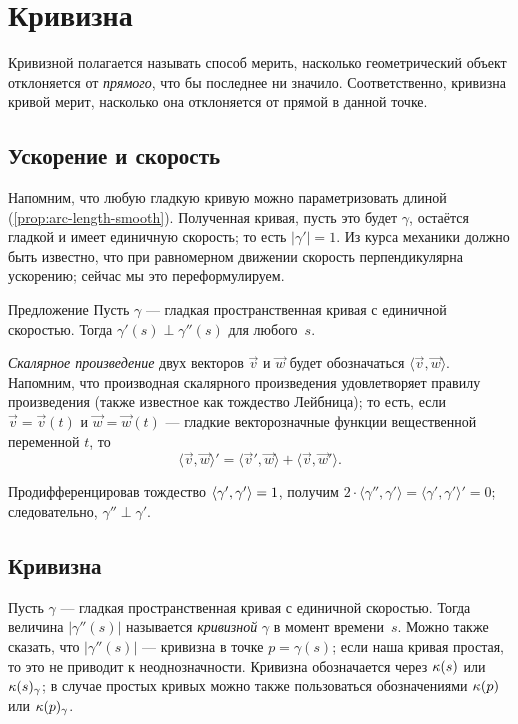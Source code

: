 \chapter{Кривизна}
\label{chap:curve-curvature}

Кривизной полагается называть способ мерить, насколько геометрический объект отклоняется от \textit{прямого}, что бы последнее ни значило.
Соответственно, кривизна кривой мерит, насколько она отклоняется от прямой в данной точке.

\section{Ускорение и скорость}

Напомним, что любую гладкую кривую можно параметризовать длиной (\ref{prop:arc-length-smooth}).
Полученная кривая, пусть это будет $\gamma$, остаётся гладкой и имеет единичную скорость;
то есть $|\gamma'|=1$.
Из курса механики должно быть известно, что при равномерном движении скорость перпендикулярна ускорению;
сейчас мы это переформулируем.

\begin{thm}{Предложение}\label{prop:a'-pertp-a''}
Пусть $\gamma$ --- гладкая пространственная кривая с единичной скоростью.
Тогда $\gamma'(s)\perp \gamma''(s)$ для любого~$s$.
\end{thm}

\emph{Скалярное произведение} двух векторов $\vec v$ и $\vec w$ будет обозначаться $\langle \vec v,\vec w\rangle$.
Напомним, что производная скалярного произведения удовлетворяет правилу произведения (также известное как тождество Лейбница);
то есть, если $\vec v=\vec v(t)$ и $\vec w=\vec w(t)$ --- гладкие векторозначные функции вещественной переменной $t$, то
\[\langle \vec v,\vec w\rangle'=\langle \vec v',\vec w\rangle+\langle \vec v,\vec w'\rangle.\]

Продифференцировав тождество $\langle\gamma',\gamma'\rangle\z=1$, получим
$2\cdot \langle\gamma'',\gamma' \rangle=\langle\gamma',\gamma'\rangle'=0$;
следовательно, $\gamma''\perp\gamma'$.
\qeds

\section{Кривизна}\label{sec:curvature}

Пусть $\gamma$ --- гладкая пространственная кривая с единичной скоростью.
Тогда величина $|\gamma''(s)|$ называется \emph{кривизной} $\gamma$ в момент времени~$s$.
Можно также сказать, что $|\gamma''(s)|$ --- кривизна в точке $p=\gamma(s)$;
если наша кривая простая, то это не приводит к неоднозначности.
Кривизна обозначается через $\kappa(s)$ или $\kappa(s)_\gamma$;
в случае простых кривых можно также пользоваться обозначениями $\kappa(p)$ или $\kappa(p)_\gamma$.

